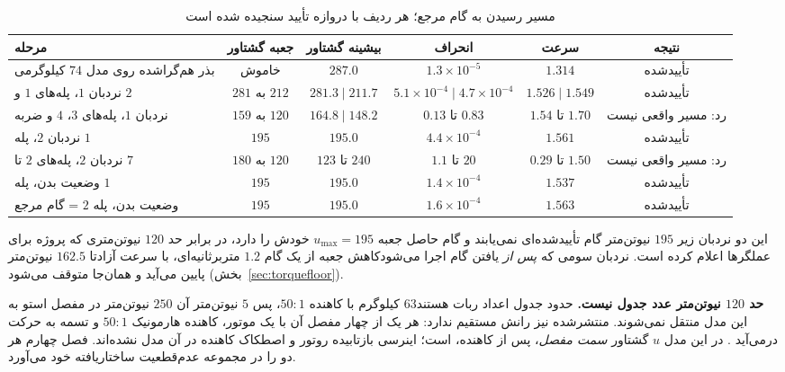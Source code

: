 \documentclass[10pt,twocolumn]{article}
\newcommand{\en}[1]{\lr{#1}}
\newcommand{\md}{\lr{\textemdash}}
\begin{document}
\begin{table}[!t]
    \centering
    \caption{مسیر رسیدن به گام مرجع؛ هر ردیف با دروازه تأیید سنجیده شده است}
    \label{tab:warm}
    \small
    \begin{tabular}{lccccc}
        \toprule
        مرحله & جعبه گشتاور & بیشینه گشتاور & انحراف & سرعت & نتیجه \\
        \midrule
        بذر هم‌گراشده روی مدل $74$ کیلوگرمی & خاموش & $287.0$ & $1.3\times10^{-5}$ & $1.314$ & تأییدشده \\
        نردبان $1$، پله‌های $1$ و $2$ & $281$ به $212$ & $281.3\;|\;211.7$ & $5.1\times10^{-4}\;|\;4.7\times10^{-4}$ & $1.526\;|\;1.549$ & تأییدشده \\
        نردبان $1$، پله‌های $3$، $4$ و ضربه & $159$ به $120$ & $164.8\;|\;148.2$ & $0.13$ تا $0.83$ & $1.54$ تا $1.70$ & رد: مسیر واقعی نیست \\
        نردبان $2$، پله $1$ & $195$ & $195.0$ & $4.4\times10^{-4}$ & $1.561$ & تأییدشده \\
        نردبان $2$، پله‌های $2$ تا $7$ & $180$ به $120$ & $123$ تا $240$ & $1.1$ تا $20$ & $0.29$ تا $1.50$ & رد: مسیر واقعی نیست \\
        وضعیت بدن، پله $1$ & $195$ & $195.0$ & $1.4\times10^{-4}$ & $1.537$ & تأییدشده \\
        وضعیت بدن، پله $2$ = گام مرجع & $195$ & $195.0$ & $1.6\times10^{-4}$ & $1.563$ & تأییدشده \\
        \bottomrule
    \end{tabular}
\end{table}

این دو نردبان زیر $195$ نیوتن‌متر گام تأییدشده‌ای نمی‌یابند و گام حاصل جعبه $u_{\max}=195$
خودش را دارد، در برابر حد $120$ نیوتن‌متری که پروژه برای عملگرها اعلام کرده است. نردبان سومی
که \emph{پس از} یافتن گام اجرا می‌شود\md{}کاهش جعبه از یک گام $1.2$ متربرثانیه‌ای، با سرعت
آزاد\md{}تا $162.5$ نیوتن‌متر پایین می‌آید و همان‌جا متوقف می‌شود (بخش~\ref{sec:torquefloor}).

\textbf{حد $120$ نیوتن‌متر عدد جدول \en{3.1} نیست.} حدود جدول \en{3.1} اعداد ربات \en{ATRIAS}
هستند\md{}$63$ کیلوگرم با کاهنده $50:1$، پس $5$ نیوتن‌متر آن $250$ نیوتن‌متر در مفصل
است\md{}و به این مدل منتقل نمی‌شوند. \en{RABBIT} منتشرشده نیز رانش مستقیم ندارد: هر یک از
چهار مفصل آن با یک موتور، کاهنده هارمونیک $50:1$ و تسمه به حرکت درمی‌آید
\cite[جدول~I و شکل~4]{chevallereau2003rabbit}. در این مدل $u$ گشتاور \emph{سمت مفصل}، پس از
کاهنده، است؛ اینرسی بازتابیده روتور و اصطکاک کاهنده در آن مدل نشده‌اند. فصل چهارم هر دو را
در مجموعه عدم‌قطعیت ساختاریافته خود می‌آورد.
\end{document}
